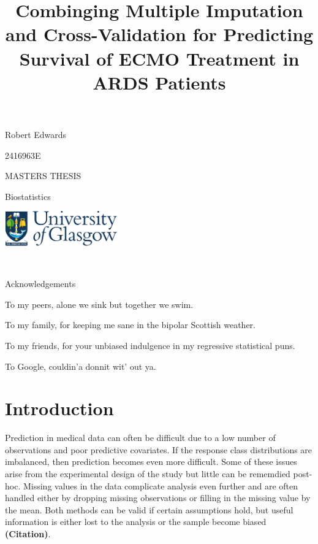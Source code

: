 \documentclass[12pt,]{article}
\title{Combinging Multiple Imputation and Cross-Validation for Predicting
Survival of ECMO Treatment in ARDS Patients}
\author{}
\date{}
\begin{document}
\maketitle

\vspace{4cm}

\begin{center}
Robert Edwards 

\vspace{0.125cm}
2416963E


\vspace{1cm}
MASTERS THESIS 

\vspace{0.125cm}
Biostatistics

\vspace{9cm}
  \includegraphics[height = 1.5cm]{images/GUlogo.png}
\end{center}

\newpage

\begin{center}
~
 
\vspace{5cm}
Acknowledgements 

\vspace{3cm}
To my peers, alone we sink but together we swim.

\vspace{1cm}
To my family, for keeping me sane in the bipolar Scottish weather. 

\vspace{1cm}
To my friends, for your unbiased indulgence in my regressive statistical puns. 

\vspace{1cm}
To Google, couldin'a donnit wit' out ya. 

\end{center}

\newpage 

\setcounter{tocdepth}{2} \tableofcontents  

\newpage

\section{Introduction}\label{introduction}

Prediction in medical data can often be difficult due to a low number of
observations and poor predictive covariates. If the response class
distributions are imbalanced, then prediction becomes even more
difficult. Some of these issues arise from the experimental design of
the study but little can be rememdied post-hoc. Missing values in the
data complicate analysis even further and are often handled either by
dropping missing observations or filling in the missing value by the
mean. Both methods can be valid if certain assumptions hold, but useful
information is either lost to the analysis or the sample become biased
\textbf{(Citation)}.
\end{document}
